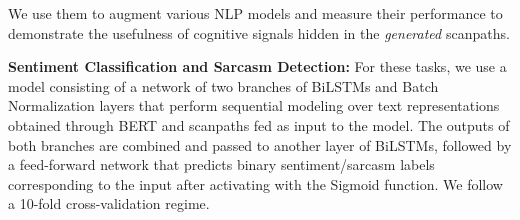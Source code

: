 
We use them to augment various NLP models and measure their performance to demonstrate the usefulness of cognitive signals hidden in the \textit{generated} scanpaths.

\textbf{Sentiment Classification and Sarcasm Detection:} For these tasks, we use a model consisting of a network of two branches of BiLSTMs and Batch Normalization layers that perform sequential modeling over text representations obtained through BERT and scanpaths fed as input to the model. The outputs of both branches are combined and passed to another layer of BiLSTMs, followed by a feed-forward network that predicts binary sentiment/sarcasm labels corresponding to the input after activating with the Sigmoid function. We follow a 10-fold cross-validation regime.


